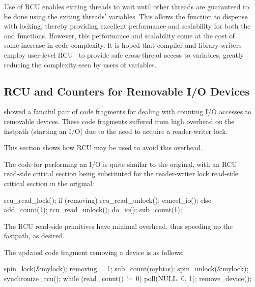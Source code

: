 Use of RCU enables exiting threads to wait until other threads are
guaranteed to be done using the exiting threads'  variables.
This allows the  function to dispense with locking,
thereby providing
excellent performance and scalability for both the 
and  functions.
However, this performance and scalability come at the cost of some increase
in code complexity.
It is hoped that compiler and library writers employ user-level
RCU~\cite{MathieuDesnoyers2009URCU} to provide safe cross-thread
access to  variables, greatly reducing the
complexity seen by users of  variables.

\subsection{RCU and Counters for Removable I/O Devices}
\label{sec:together:RCU and Counters for Removable I/O Devices}

showed a fanciful pair of code fragments for dealing with counting
I/O accesses to removable devices.
These code fragments suffered from high overhead on the fastpath
(starting an I/O) due to the need to acquire a reader-writer
lock.

This section shows how RCU may be used to avoid this overhead.

The code for performing an I/O is quite similar to the original, with
an RCU read-side critical section being substituted for the reader-writer
lock read-side critical section in the original:

\begin{VerbatimN}[tabsize=8]
rcu_read_lock();
if (removing) {
	rcu_read_unlock();
	cancel_io();
} else {
	add_count(1);
	rcu_read_unlock();
	do_io();
	sub_count(1);
}
\end{VerbatimN}
\vspace{5pt}

The RCU read-side primitives have minimal overhead, thus speeding up
the fastpath, as desired.

The updated code fragment removing a device is as follows:

\begin{fcvlabel}
\begin{VerbatimN}[tabsize=8,commandchars=\\\[\]]
spin_lock(&mylock);
removing = 1;
sub_count(mybias);
spin_unlock(&mylock);
synchronize_rcu();
while (read_count() != 0) {	\lnlbl[nextofsync]
	poll(NULL, 0, 1);
}
remove_device();
\end{VerbatimN}
\end{fcvlabel}

